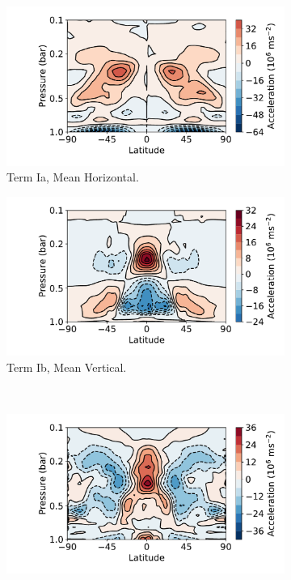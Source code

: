 \begin{figure}
  \centering
  \begin{subfigure}[t]{0.48\textwidth}
    \includegraphics[width=\textwidth]{figures/eqm-zonal-flow/0_flux.pdf}
    \caption{Term Ia, Mean Horizontal.}\label{fig:mean-horiz}
  \end{subfigure}
\quad
  \begin{subfigure}[t]{0.48\textwidth}
    \includegraphics[width=\textwidth]{figures/eqm-zonal-flow/1_flux.pdf}
    \caption{Term Ib, Mean Vertical.}\label{fig:mean-vert}
  \end{subfigure}
  \\
  \begin{subfigure}[t]{0.48\textwidth}
    \includegraphics[width=\textwidth]{figures/eqm-zonal-flow/2_flux.pdf}

\end{subfigure}
\end{figure}
